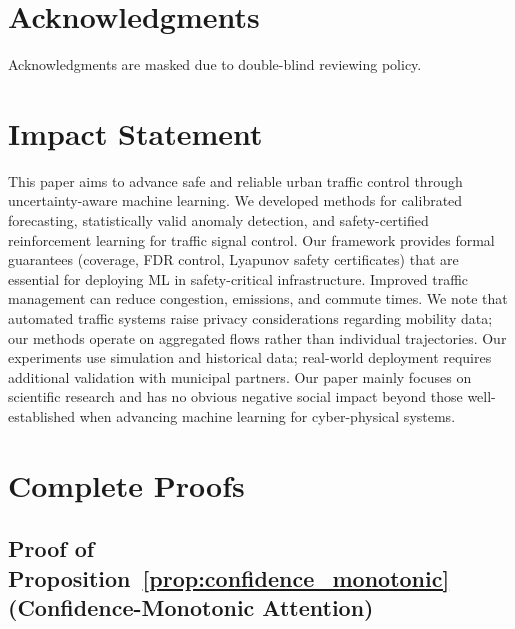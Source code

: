 \documentclass{article}
\theoremstyle{plain}
\theoremstyle{definition}
\theoremstyle{remark}
\begin{document}
\section*{Acknowledgments}
Acknowledgments are masked due to double-blind reviewing policy.

\section*{Impact Statement}

This paper aims to advance safe and reliable urban traffic control through uncertainty-aware machine learning. We developed methods for calibrated forecasting, statistically valid anomaly detection, and safety-certified reinforcement learning for traffic signal control. Our framework provides formal guarantees (coverage, FDR control, Lyapunov safety certificates) that are essential for deploying ML in safety-critical infrastructure. Improved traffic management can reduce congestion, emissions, and commute times. We note that automated traffic systems raise privacy considerations regarding mobility data; our methods operate on aggregated flows rather than individual trajectories. Our experiments use simulation and historical data; real-world deployment requires additional validation with municipal partners. Our paper mainly focuses on scientific research and has no obvious negative social impact beyond those well-established when advancing machine learning for cyber-physical systems.




\newpage
\appendix
\onecolumn

\section{Complete Proofs}
\label{app:proofs}

\subsection{Proof of Proposition~\ref{prop:confidence_monotonic} (Confidence-Monotonic Attention)}
\label{app:proof_monotonic}
\end{document}
